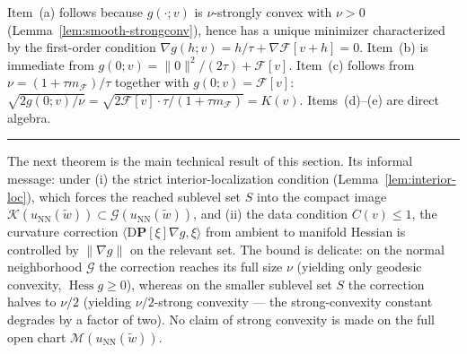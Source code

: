 \documentclass[twoside,11pt]{article}
\newcommand{\BlackBoxProof}{\rule{1.5ex}{1.5ex}}
\renewenvironment{proof}{\par\noindent{\bf Proof\ }}{\hfill\BlackBoxProof\par\medskip}
\renewcommand{\P}{\mathbf{P}}
\newcommand{\D}{\mathrm{D}}
\newcommand{\Hess}{\operatorname{Hess} }
\newcommand{\NN}{\mathrm{NN}}
\newcommand{\calF}{\mathcal{F}}
\newcommand{\calG}{\mathcal{G}}
\newcommand{\calK}{\mathcal{K}}
\newcommand{\calM}{\mathcal{M}}
\begin{document}
\begin{proof}
Item~(a) follows because $g(\cdot;v)$ is $\nu$-strongly convex with $\nu>0$ (Lemma~\ref{lem:smooth-strongconv}), hence has a unique minimizer characterized by the first-order condition $\nabla g(h;v)=h/\tau+\nabla\calF[v+h]=0$.
Item~(b) is immediate from $g(0;v)=\|0\|^{2}/(2\tau)+\calF[v]$.
Item~(c) follows from $\nu=(1+\tau m_\calF)/\tau$ together with $g(0;v)=\calF[v]$:
\(
\sqrt{2g(0;v)/\nu}=\sqrt{2\calF[v]\cdot\tau/(1+\tau m_\calF)}=K(v).
\)
Items~(d)--(e) are direct algebra.
\end{proof}

The next theorem is the main technical result of this section. Its informal message: under (i) the strict interior-localization condition (Lemma~\ref{lem:interior-loc}), which forces the reached sublevel set $S$ into the compact image $\calK(u_\NN(\tilde w))\subset\calG(u_\NN(\tilde w))$, and (ii) the data condition $C(v)\le 1$, the curvature correction $\langle \D\P[\xi]\nabla g,\xi\rangle$ from ambient to manifold Hessian is controlled by $\|\nabla g\|$ on the relevant set. The bound is delicate: on the normal neighborhood $\calG$ the correction reaches its full size $\nu$ (yielding only geodesic convexity, $\Hess g\ge 0$), whereas on the smaller sublevel set $S$ the correction halves to $\nu/2$ (yielding $\nu/2$-strong convexity --- the strong-convexity constant degrades by a factor of two). No claim of strong convexity is made on the full open chart $\calM(u_\NN(\tilde w))$.
\end{document}
